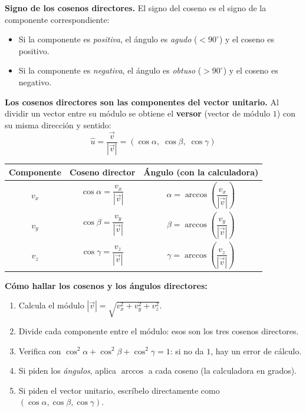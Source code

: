 \documentclass[12pt, letterpaper]{article}
\begin{document}
\begin{cuadroteoria}
  \textbf{Signo de los cosenos directores.} El signo del coseno es el signo de la componente correspondiente:
  \begin{itemize}[leftmargin=*]
    \item Si la componente es \emph{positiva}, el ángulo es \emph{agudo} ($< 90^{\circ}$) y el coseno es positivo.
    \item Si la componente es \emph{negativa}, el ángulo es \emph{obtuso} ($> 90^{\circ}$) y el coseno es negativo.
  \end{itemize}

  \textbf{Los cosenos directores son las componentes del vector unitario.} Al dividir un vector entre su módulo se obtiene el \textbf{versor} (vector de módulo $1$) con su misma dirección y sentido:
  $$\hat{u} = \frac{\vec{v}}{|\vec{v}|} = (\cos\alpha,\; \cos\beta,\; \cos\gamma)$$
  \begin{center}
    \begin{tabular}{ccc}
      \toprule
      Componente & Coseno director & Ángulo (con la calculadora) \\
      \midrule
      $v_x$ & $\cos\alpha = \dfrac{v_x}{|\vec{v}|}$ & $\alpha = \arccos\!\left(\dfrac{v_x}{|\vec{v}|}\right)$ \\
      $v_y$ & $\cos\beta = \dfrac{v_y}{|\vec{v}|}$  & $\beta = \arccos\!\left(\dfrac{v_y}{|\vec{v}|}\right)$  \\
      $v_z$ & $\cos\gamma = \dfrac{v_z}{|\vec{v}|}$ & $\gamma = \arccos\!\left(\dfrac{v_z}{|\vec{v}|}\right)$ \\
      \bottomrule
    \end{tabular}
  \end{center}
\end{cuadroteoria}

\begin{cuadropasos}
  \textbf{Cómo hallar los cosenos y los ángulos directores:}
  \begin{enumerate}[leftmargin=*]
    \item Calcula el módulo $|\vec{v}| = \sqrt{v_x^2 + v_y^2 + v_z^2}$.
    \item Divide cada componente entre el módulo: esos son los tres cosenos directores.
    \item Verifica con $\cos^2\alpha + \cos^2\beta + \cos^2\gamma = 1$: si no da $1$, hay un error de cálculo.
    \item Si piden los \emph{ángulos}, aplica $\arccos$ a cada coseno (la calculadora en grados).
    \item Si piden el vector unitario, escríbelo directamente como $(\cos\alpha, \cos\beta, \cos\gamma)$.
  \end{enumerate}
\end{cuadropasos}
\end{document}
